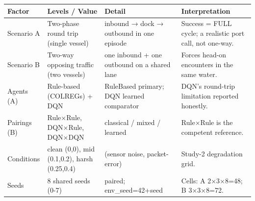 \begin{tabular}{llll}
\toprule
Factor & Levels / Value & Detail & Interpretation \\
\midrule
Scenario A & Two-phase round trip (single vessel) & inbound → dock → outbound in one episode & Success = FULL cycle; a realistic port call, not one-way. \\
Scenario B & Two-way opposing traffic (two vessels) & one inbound + one outbound on a shared lane & Forces head-on encounters in the same water. \\
Agents (A) & Rule-based (COLREGs) + DQN & RuleBased primary; DQN learned comparator & DQN's round-trip limitation reported honestly. \\
Pairings (B) & Rule×Rule, DQN×Rule, DQN×DQN & classical / mixed / learned & Rule×Rule is the competent reference. \\
Conditions & clean (0,0), mid (0.1,0.2), harsh (0.25,0.4) & (sensor noise, packet-error) & Study-2 degradation grid. \\
Seeds & 8 shared seeds (0-7) & paired; env\_seed=42+seed & Cells: A 2×3×8=48; B 3×3×8=72. \\
\bottomrule
\end{tabular}
